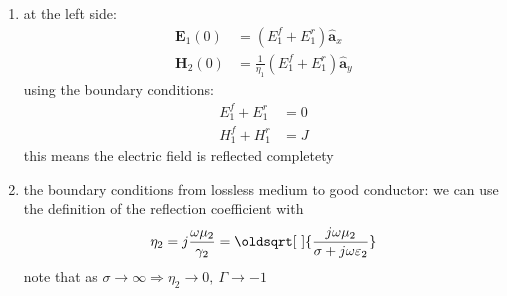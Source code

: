 \documentclass[a4paper,11pt]{article}
\renewcommand*{\sqrt}[2][\ ]{\oldsqrt[#1]{#2}}
\newcommand{\bvec}[1]{\mathbf{#1}}
\newcommand{\uvec}[1]{\hat{\mathbf{a}}_{#1} }
\begin{document}
\begin{enumerate}
\begin{itemize}
			\end{itemize}
		\item at the left side: 
			\begin{align*}
				\bvec{E}_1(0) &= (E_1^f + E_1^r)\uvec{x} \\
				\bvec{H}_2(0) &= \frac{1}{\eta_1}(E_1^f + E_1^r)\uvec{y}
			\end{align*}
		using the boundary conditions:
			\begin{align*}
				E_1^f + E_1^r &= 0 \\
				H_1^f + H_1^r &= J
			\end{align*}	
		this means the electric field is reflected completety 
		\item the boundary conditions from lossless medium to good conductor: we can use the definition of the reflection coefficient with $$\eta_2 = j\frac{\omega\mu_2}{\gamma_2} = \sqrt{\frac{j\omega\mu_2}{\sigma + j\omega\varepsilon_2}}$$
		note that as $\sigma \to \infty \Longrightarrow \eta_2 \to 0,~\Gamma \to -1$
	\end{enumerate}
\end{document}
